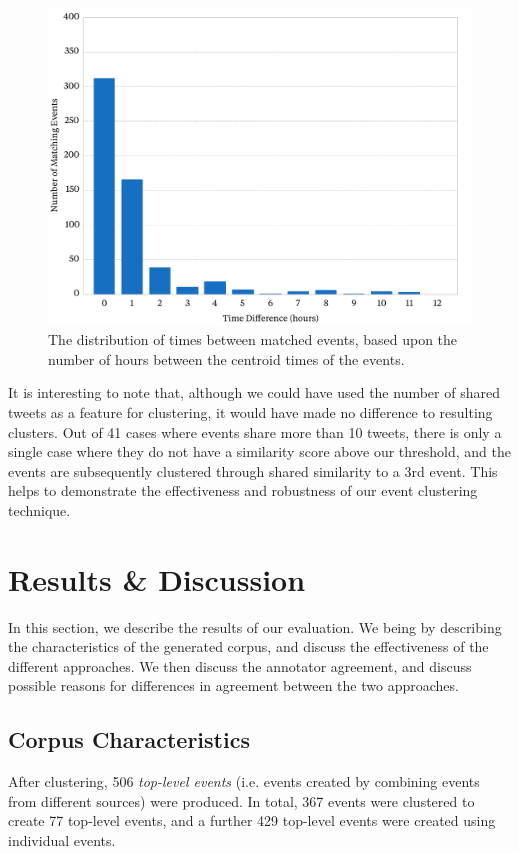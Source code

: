 \begin{figure}
\includegraphics[width=\textwidth]{./Chapters/Collection/images/times}
\caption{The distribution of times between matched events, based upon the number of hours between the centroid times of the events.}
\label{fig:dif_diff}
\end{figure}

It is interesting to note that, although we could have used the number of shared tweets as a feature for clustering, it would have made no difference to resulting clusters.
Out of 41 cases where events share more than 10 tweets, there is only a single case where they do not have a similarity score above our threshold, and the events are subsequently clustered through shared similarity to a 3rd event.
This helps to demonstrate the effectiveness and robustness of our event clustering technique.

\section{Results \& Discussion}
\label{collection:sec:results}
In this section, we describe the results of our evaluation.
We being by describing the characteristics of the generated corpus, and discuss the effectiveness of the different approaches.
We then discuss the annotator agreement, and discuss possible reasons for differences in agreement between the two approaches.

\subsection{Corpus Characteristics}
After clustering, 506 \emph{top-level events} (i.e. events created by combining events from different sources) were produced.
In total, 367 events were clustered to create 77 top-level events, and a further 429 top-level events were created using individual events.

